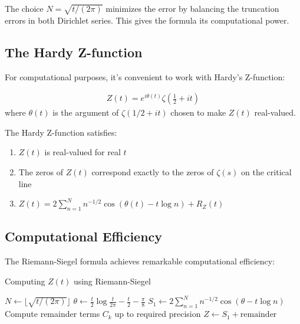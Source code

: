 \begin{remark}
The choice $N = \sqrt{t/(2\pi)}$ minimizes the error by balancing the truncation errors in both Dirichlet series. This gives the formula its computational power.
\end{remark}

\subsection{The Hardy Z-function}

For computational purposes, it's convenient to work with Hardy's Z-function:

\begin{definition}
\begin{align}
Z(t) = e^{i\theta(t)} \zeta\left(\frac{1}{2} + it\right)
\end{align}
where $\theta(t)$ is the argument of $\zeta(1/2 + it)$ chosen to make $Z(t)$ real-valued.
\end{definition}

\begin{theorem}[Properties of Z(t)]
The Hardy Z-function satisfies:
\begin{enumerate}
\item $Z(t)$ is real-valued for real $t$
\item The zeros of $Z(t)$ correspond exactly to the zeros of $\zeta(s)$ on the critical line
\item $Z(t) = 2\sum_{n=1}^{N} n^{-1/2} \cos(\theta(t) - t\log n) + R_Z(t)$
\end{enumerate}
\end{theorem}

\subsection{Computational Efficiency}

The Riemann-Siegel formula achieves remarkable computational efficiency:

\begin{algorithm}[H]
\caption{Computing $Z(t)$ using Riemann-Siegel}
\begin{algorithmic}
\State $N \leftarrow \lfloor\sqrt{t/(2\pi)}\rfloor$
\State $\theta \leftarrow \frac{t}{2}\log\frac{t}{2\pi} - \frac{t}{2} - \frac{\pi}{8}$
\State $S_1 \leftarrow 2\sum_{n=1}^{N} n^{-1/2} \cos(\theta - t\log n)$
\State Compute remainder terms $C_k$ up to required precision
\State $Z \leftarrow S_1 + \text{remainder}$
\end{algorithmic}
\end{algorithm}

